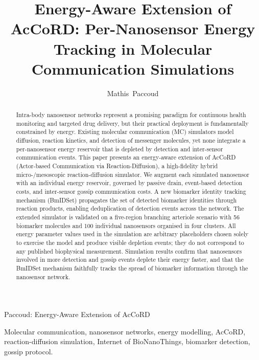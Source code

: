 \documentclass[journal]{IEEEtran}
\begin{document}
\title{Energy-Aware Extension of AcCoRD: Per-Nanosensor Energy Tracking in Molecular Communication Simulations}

\author{Mathis~Paccoud}

%
{Paccoud: Energy-Aware Extension of AcCoRD}

\maketitle

\begin{abstract}
Intra-body nanosensor networks represent a promising paradigm for continuous
health monitoring and targeted drug delivery, but their practical deployment
is fundamentally constrained by energy. Existing molecular communication (MC)
simulators model diffusion, reaction kinetics, and detection of messenger
molecules, yet none integrate a per-nanosensor energy reservoir that is
depleted by detection and inter-sensor communication events. This paper
presents an energy-aware extension of AcCoRD (Actor-based Communication via
Reaction-Diffusion), a high-fidelity hybrid micro-/mesoscopic reaction-diffusion
simulator. We augment each simulated nanosensor with an individual energy
reservoir, governed by passive drain, event-based detection costs, and
inter-sensor gossip communication costs. A new biomarker identity tracking
mechanism (BmIDSet) propagates the set of detected biomarker identities
through reaction products, enabling deduplication of detection events across
the network. The extended simulator is validated on a five-region branching
arteriole scenario with 56 biomarker molecules and 100 individual nanosensors
organised in four clusters. All energy parameter values used in the simulation
are arbitrary placeholders chosen solely to exercise the model and produce
visible depletion events; they do not correspond to any published biophysical
measurement. Simulation results confirm that nanosensors involved in more
detection and gossip events deplete their energy faster, and that the BmIDSet
mechanism faithfully tracks the spread of biomarker information through the
nanosensor network.
\end{abstract}

\begin{IEEEkeywords}
Molecular communication, nanosensor networks, energy modelling, AcCoRD,
reaction-diffusion simulation, Internet of BioNanoThings, biomarker detection,
gossip protocol.
\end{IEEEkeywords}
\end{document}
